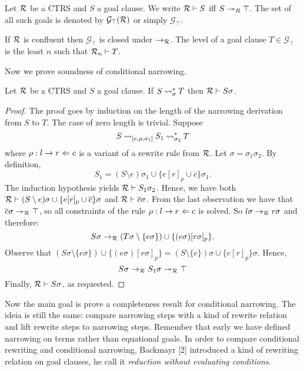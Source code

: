 \begin{definition}
	Let $\mathcal{R}$ be a CTRS and $S$ a goal clause. We write $\mathcal{R} \vdash S$ iff $S \twoheadrightarrow_R \top$. The set of all such goals is denoted by $\mathcal{G}_\top(\mathcal{R})$ or simply $\mathcal{G}_\top$.
\end{definition}

If $\mathcal{R}$ is confluent then $\mathcal{G}_\top$ is closed under $\rightarrow_{\mathcal{R}}$. The level of a goal clause $T \in \mathcal{G}_\top$ is the least $n$ such that $\mathcal{R}_n \vdash T$.

Now we prove soundness of conditional narrowing.

\begin{theorem}
	Let $\mathcal{R}$ be a CTRS and $S$ a goal clause. If $S \mathbin{\rightsquigarrow}_\sigma^* T$ then $\mathcal{R} \vdash S \sigma$.
	\begin{proof}
		The proof goes by induction on the length of the narrowing derivation from $S$ to $T$. The case of zero length is trivial. Suppose
		$$S \mathbin{\rightsquigarrow}_{[e, \rho, \sigma_1]} S_1 \mathbin{\rightsquigarrow}_{\sigma_2}^* T$$
		where $\rho : l \rightarrow r \Leftarrow c$ is a variant of a rewrite rule from $\mathcal{R}$. Let $\sigma = \sigma_1 \sigma_2$. By definition,
		$$S_1 = (S \setminus {e})\sigma_1 \cup \{ e[r]_p \cup \overline{c} \}\sigma_1.$$
		The induction hypothesis yields $\mathcal{R} \vdash S_1 \sigma_2$. Hence, we have both $\mathcal{R} \vdash (S \setminus {e}) \sigma \cup \{e[r]_p \cup \overline{c} \}\sigma$ and $\mathcal{R} \vdash \overline{c} \sigma$. From the last observation we have that $\overline{c}\sigma \twoheadrightarrow_{\mathcal{R}} \top$, so all constraints of the rule $\rho : l \rightarrow r \Leftarrow c$ is solved. So $l\sigma \rightarrow_{\mathcal{R}} r \sigma$ and therefore:
		$$S \sigma \rightarrow_{\mathcal{R}} (T \sigma \setminus \{ e\sigma \}) \cup \{ (e\sigma)[r\sigma]_p \}.$$
		Observe that $(S \sigma \setminus \{ e\sigma \}) \cup \{ (e\sigma)[r\sigma]_p \} = (S \setminus \{e\})\sigma \cup \{ e[r]_p \}\sigma$. Hence,
		$$S \sigma \rightarrow_{\mathcal{R}} S_1\sigma \twoheadrightarrow_{\mathcal{R}} \top$$
		Finally, $\mathcal{R} \vdash S \sigma$, as requested.
	\end{proof}
\end{theorem}

Now the main goal is prove a completeness result for conditional narrowing. The ideia is still the same: compare narrowing steps with a kind of rewrite relation and lift rewrite steps to narrowing steps. Remember that early we have defined narrowing on terms rather than equational goals. In order to compare conditional rewriting and conditional narrowing, Backmayr [2] introduced a kind of rewriting relation on goal clauses, he call it \textit{reduction without evaluating conditions}.

